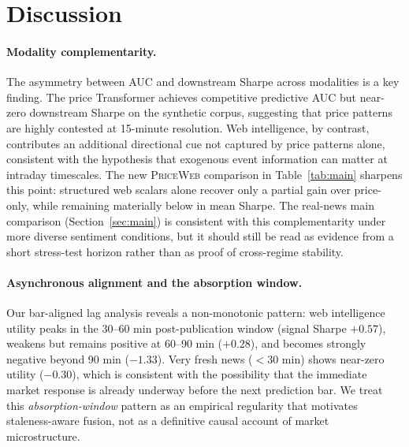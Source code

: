 \section{Discussion}
\label{sec:discussion}

\paragraph{Modality complementarity.}
The asymmetry between AUC and downstream Sharpe across modalities is a key finding.
The price Transformer achieves competitive predictive AUC but near-zero downstream Sharpe on the synthetic corpus, suggesting that price patterns are highly contested at 15-minute resolution.
Web intelligence, by contrast, contributes an additional directional cue not captured by price patterns alone, consistent with the hypothesis that exogenous event information can matter at intraday timescales.
The new \textsc{PriceWeb} comparison in Table~\ref{tab:main} sharpens this point: structured web scalars alone recover only a partial gain over price-only, while remaining materially below \CGCMA{} in mean Sharpe.
The real-news main comparison (Section~\ref{sec:main}) is consistent with this complementarity under more diverse sentiment conditions, but it should still be read as evidence from a short stress-test horizon rather than as proof of cross-regime stability.

\paragraph{Asynchronous alignment and the absorption window.}
Our bar-aligned lag analysis reveals a non-monotonic pattern: web intelligence utility peaks in the 30--60 min post-publication window (signal Sharpe $+0.57$), weakens but remains positive at 60--90 min ($+0.28$), and becomes strongly negative beyond 90 min ($-1.33$).
Very fresh news ($<$30 min) shows near-zero utility ($-0.30$), which is consistent with the possibility that the immediate market response is already underway before the next prediction bar.
We treat this \emph{absorption-window} pattern as an empirical regularity that motivates staleness-aware fusion, not as a definitive causal account of market microstructure.

